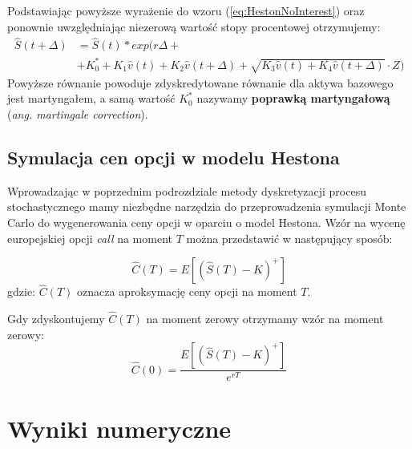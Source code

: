 \documentclass{pracamgr}
\begin{document}
Podstawiając powyższe wyrażenie do wzoru (\ref{eq:HestonNoInterest}) oraz ponownie uwzględniając
niezerową wartość stopy procentowej otrzymujemy:
\begin{equation}
\begin{aligned}
\label{eq:HestonInterestMartingale} 
\hat{S}(t + \Delta) &= \hat{S}(t) * exp(r \Delta+\\ 
                    &+ K_0^* + K_1 \hat{v}(t) 
                    + K_2 \hat{v}(t+\Delta)
                    + \sqrt{K_3 \hat{v}(t) +  K_4 \hat{v}(t+\Delta)} \cdot Z)

\end{aligned}
\end{equation}
Powyższe równanie powoduje zdyskredytowane równanie dla aktywa bazowego jest martyngałem, a samą
wartość $K_0^*$ nazywamy \textbf{poprawką martyngałową} (\textit{ang. martingale correction}).


\section{Symulacja cen opcji w modelu Hestona}

Wprowadzając w poprzednim podrozdziale metody dyskretyzacji procesu stochastycznego mamy niezbędne 
narzędzia do przeprowadzenia symulacji Monte Carlo do wygenerowania ceny opcji w oparciu o model 
Hestona.
Wzór na wycenę europejskiej opcji \textit{call} na moment $T$ można przedstawić w następujący sposób:

\begin{equation}
  \hat{C}(T) = E \left[ (\hat{S}(T) - K)^{+}  \right]
\end{equation}
gdzie: $\hat{C}(T)$ oznacza aproksymację ceny opcji na moment $T$.


Gdy zdyskontujemy $\hat{C}(T)$ na moment zerowy otrzymamy wzór na moment zerowy:
\begin{equation}
\label{eq:monteCarloMean}
  \hat{C}(0) = \frac{E \left[ (\hat{S}(T) - K)^{+} \right]}{e^{rT}} 
\end{equation}





\chapter{Wyniki numeryczne}\label{r:sp}
\end{document}
